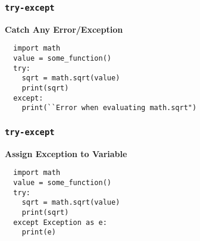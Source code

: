 \documentclass{beamer}
\begin{document}
\begin{frame}[fragile]
  \frametitle{\texttt{try-except}}

  \textbf{Catch Any Error/Exception}
  \begin{lstlisting}
  import math
  value = some_function()
  try:
    sqrt = math.sqrt(value)
    print(sqrt)
  except:
    print(``Error when evaluating math.sqrt")
  \end{lstlisting}
\end{frame}


\begin{frame}[fragile]
  \frametitle{\texttt{try-except}}

  \textbf{Assign Exception to Variable}
  \begin{lstlisting}
  import math
  value = some_function()
  try:
    sqrt = math.sqrt(value)
    print(sqrt)
  except Exception as e:
    print(e)
  \end{lstlisting}
\end{frame}
\end{document}
